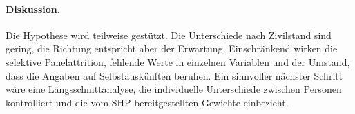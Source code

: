 \begin{extraAbstract}
\paragraph{Diskussion.}
Die Hypothese wird teilweise gestützt. Die Unterschiede nach Zivilstand sind gering, die
Richtung entspricht aber der Erwartung. Einschränkend wirken die selektive
Panelattrition, fehlende Werte in einzelnen Variablen und der Umstand, dass die Angaben
auf Selbstauskünften beruhen. Ein sinnvoller nächster Schritt wäre eine
Längsschnittanalyse, die individuelle Unterschiede zwischen Personen kontrolliert und
die vom SHP bereitgestellten Gewichte einbezieht.

\end{extraAbstract}
